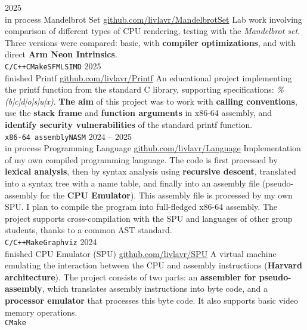 \documentclass[10pt]{developercv}
\begin{document}
\vspace{-20 pt}
\vspace{-5 pt}
\begin{entrylist}
	\entry
		{2025\\\footnotesize{in process}}
		{Mandelbrot Set}
		{\href{https://github.com/livlavr/MandelbrotSet}{github.com/livlavr/MandelbrotSet}}
		{Lab work involving comparison of different types of CPU rendering, testing with the \textit{Mandelbrot set}. Three versions were compared: basic, with \textbf{compiler optimizations}, and with direct \textbf{Arm Neon Intrinsics}.\\\texttt{C/C++}\slashsep\texttt{CMake}\slashsep\texttt{SFML}\slashsep\texttt{SIMD}}
	\entry
		{2025\\\footnotesize{finished}}
		{Printf}
        {\href{https://github.com/livlavr/Printf}{github.com/livlavr/Printf}}
		{An educational project implementing the printf function from the standard C library, supporting specifications: \textit{\%(b|c|d|o|s|u|x)}. \textbf{The aim} of this project was to work with \textbf{calling conventions}, use the \textbf{stack frame} and \textbf{function arguments} in x86-64 assembly, and \textbf{identify security vulnerabilities} of the standard printf function.\\ \texttt{x86-64 assembly}\slashsep\texttt{NASM}}
	\entry
		{2024 -- 2025\\\footnotesize{in process}}
		{Programming Language}
        {\href{https://github.com/livlavr/Language}{github.com/livlavr/Language}}
		{Implementation of my own compiled programming language. The code is first processed by \textbf{lexical analysis}, then by syntax analysis using \textbf{recursive descent}, translated into a syntax tree with a name table, and finally into an assembly file (pseudo-assembly for the \textbf{CPU Emulator}). This assembly file is processed by my own SPU. I plan to compile the program into full-fledged x86-64 assembly. The project supports cross-compilation with the SPU and languages of other group students, thanks to a common AST standard.\\ \texttt{C/C++}\slashsep\texttt{Make}\slashsep\texttt{Graphviz}}
    \entry
		{2024\\\footnotesize{finished}}
		{CPU Emulator (SPU)}
        {\href{https://github.com/livlavr/SPU}{github.com/livlavr/SPU}}
		{A virtual machine emulating the interaction between the CPU and assembly instructions (\textbf{Harvard architecture}). The project consists of two parts: an \textbf{assembler for pseudo-assembly}, which translates assembly instructions into byte code, and a \textbf{processor emulator} that processes this byte code. It also supports basic video memory operations.\\ \texttt{C}\slashsep\texttt{Make}}
\end{entrylist}
\end{document}
